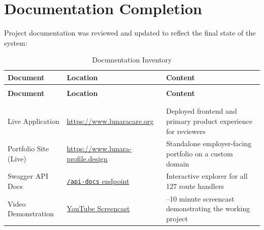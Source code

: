 \documentclass[12pt,letterpaper]{article}
\begin{document}
\newpage

\section{Documentation Completion}

Project documentation was reviewed and updated to reflect the final state of the system:

\newcommand{\ghblob}{https://github.com/omniV1/lunaraCare/blob/main}
\newcommand{\ghtree}{https://github.com/omniV1/lunaraCare/tree/main}

{\small
\begin{longtable}{|>{\raggedright\arraybackslash}p{3.5cm}|>{\raggedright\arraybackslash}p{4.8cm}|>{\raggedright\arraybackslash}p{4.7cm}|}
\caption{Documentation Inventory}\label{tab:docs}\\
\hline
\rowcolor{TableHeader}\textcolor{TableHeaderText}{\textbf{Document}} & \textcolor{TableHeaderText}{\textbf{Location}} & \textcolor{TableHeaderText}{\textbf{Content}} \\
\hline
\endfirsthead
\multicolumn{3}{l}{\small\itshape\color{gray} Table~\ref{tab:docs} continued from previous page}\\[0.5em]
\hline
\rowcolor{TableHeader}\textcolor{TableHeaderText}{\textbf{Document}} & \textcolor{TableHeaderText}{\textbf{Location}} & \textcolor{TableHeaderText}{\textbf{Content}} \\
\hline
\endhead
\hline
\multicolumn{3}{r}{\small\itshape\color{gray} Continued on next page}\\
\endfoot
\hline
\endlastfoot

\multicolumn{3}{|l|}{\cellcolor{LunaraBlue!10}\textbf{Live Deployments}} \\
\hline
Live Application & \url{https://www.lunaracare.org} & Deployed frontend and primary product experience for reviewers \\
\hline
\rowcolor{TableRowAlt}
Portfolio Site (Live) & \url{https://www.lunara-profile.design} & Standalone employer-facing portfolio on a custom domain \\
\hline
Swagger API Docs & \href{https://lunara.onrender.com/api-docs}{\texttt{/api-docs} endpoint} & Interactive explorer for all 127 route handlers \\
\hline
\rowcolor{TableRowAlt}
Video Demonstration & \href{https://www.youtube.com/watch?v=EY6ncwOMFUQ}{YouTube Screencast} & 5--10 minute screencast demonstrating the working project \\
\hline


\end{longtable}}
\end{document}
